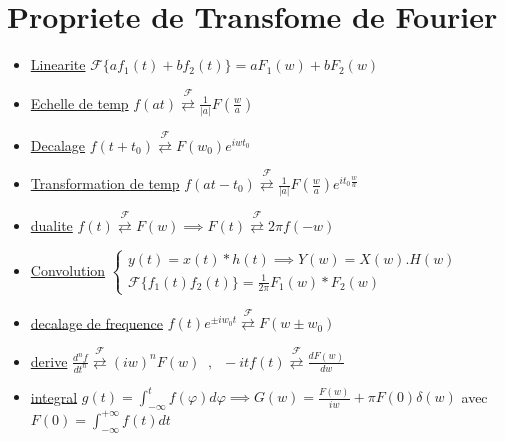 \documentclass[12pt]{book}
\newcommand{\fourier}{\mathcal{F}}
\begin{document}
            \section{Propriete de Transfome de Fourier}
                \begin{itemize}
                    \item \underline{Linearite} $\fourier\{ af_1(t) +bf_2(t) \} = aF_1(w) + bF_2(w)$
                    \item \underline{Echelle de temp} $f(at)\overset{\fourier}{\rightleftarrows}\frac{1}{|a|}F(\frac{w}{a})$
                    \item \underline{Decalage} $f(t+t_0)\overset{\fourier}{\rightleftarrows}F(w_0)e^{iwt_0}$
                    \item \underline{Transformation de temp} $f(at-t_0)\overset{\fourier}{\rightleftarrows}\frac{1}{|a|}F(\frac{w}{a})e^{it_0\frac{w}{a}}$
                    \item \underline{dualite} $f(t)\overset{\fourier}{\rightleftarrows}F(w) \implies F(t)\overset{\fourier}{\rightleftarrows} 2\pi f(-w)$
                    \item \underline{Convolution} $\begin{cases}
                        y(t)=x(t)*h(t) \implies Y(w)=X(w).H(w) \\
                        \fourier\{ f_1(t)f_2(t) \} = \frac{1}{2\pi}F_1(w)*F_2(w)
                        \end{cases}$
                    \item \underline{decalage de frequence} $f(t)e^{\pm iw_0t} \overset{\fourier}{\rightleftarrows} F(w\pm w_0)$
                    \item \underline{derive} $\frac{d^nf}{dt^n}\overset{\fourier}{\rightleftarrows}(iw)^nF(w) \; \; , \; \; -itf(t)\overset{\fourier}{\rightleftarrows}\frac{dF(w)}{dw}$
                    \item \underline{integral} $g(t) = \int^t_{-\infty}f(\varphi)d\varphi \implies G(w) = \frac{F(w)}{iw}+\pi F(0)\delta(w)$ avec $F(0) = \int^{+\infty}_{-\infty}f(t)dt$
                \end{itemize}
\end{document}
